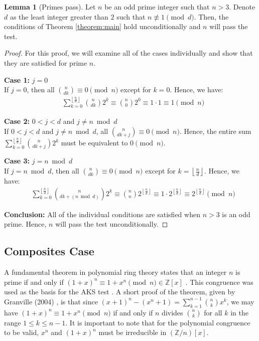 \documentclass{article}
\theoremstyle{plain}
\theoremstyle{definition}
\newtheorem{lemma}{Lemma}
\newcommand{\floor}[1]{\left\lfloor #1 \right\rfloor}
\newcommand{\Z}{\mathbb{Z}}
\newcommand{\Zn}{\Z/n}
\begin{document}
\begin{lemma}[Primes pass] \label{lemma:primes}
Let $n$ be an odd prime integer such that $n > 3$. Denote $d$ as the least integer greater than $2$ such that $n \not\equiv 1 \pmod{d}$. Then, the conditions of Theorem \ref{theorem:main} hold unconditionally and $n$ will pass the test.
\end{lemma}
\begin{proof}
For this proof, we will examine all of the cases individually and show that they are satisfied for prime $n$.

\textbf{Case 1:} $j=0$ \\
If $j = 0$, then all $\binom{n}{d k} \equiv 0 \pmod{n}$ except for $k=0$. Hence, we have:
\begin{align}
    & \sum_{k=0}^{\floor{\frac{n}{d}}} \binom{n}{d k} 2^{k} \equiv \binom{n}{0} 2^{0} \equiv 1 \cdot 1 \equiv 1 \pmod{n}
\end{align}

\textbf{Case 2:} $0 < j < d$ and $j \neq n \bmod{d}$ \\
If $0 < j < d$ and $j \neq n \bmod{d}$, all $\binom{n}{d k + j} \equiv 0 \pmod{n}$. Hence, the entire sum $\sum_{k=0}^{\floor{\frac{n}{d}}} \binom{n}{d k + j} 2^{k}$ must be equivalent to $0 \pmod{n}$.

\textbf{Case 3:} $j=n \bmod{d}$ \\
If $j = n \bmod{d}$, then all $\binom{n}{d k} \equiv 0 \pmod{n}$ except for $k=\floor{\frac{n}{d}}$. Hence, we have:
\begin{align}
    & \sum_{k=0}^{\floor{\frac{n}{d}}} \binom{n}{d k + (n \bmod{d})} 2^{k} \equiv \binom{n}{n} 2^{\floor{\frac{n}{d}}} \equiv 1 \cdot 2^{\floor{\frac{n}{d}}} \equiv 2^{\floor{\frac{n}{d}}} \pmod{n}
\end{align}

\textbf{Conclusion:}
All of the individual conditions are satisfied when $n > 3$ is an odd prime. Hence, $n$ will pass the test unconditionally.
\end{proof}

\subsection{Composites Case}

A fundamental theorem in polynomial ring theory states that an integer $n$ is prime if and only if $(1 + x)^n \equiv 1 + x^n \pmod{n} \in \Z[x]$ \cite{granville2004primes}. This congruence was used as the basis for the AKS test \cite{aks2002}. A short proof of the theorem, given by Granville (2004) \cite{granville2004primes}, is that since $(x + 1)^n - (x^n + 1) = \sum_{k=1}^{n-1} \binom{n}{k} x^k$, we may have $(1 + x)^n \equiv 1 + x^n \pmod{n}$ if and only if $n$ divides $\binom{n}{k}$ for all $k$ in the range $1 \leq k \leq n-1$. It is important to note that for the polynomial congruence to be valid, $x^n$ and $(1+x)^n$ must be irreducible in $(\Zn)[x]$.
\end{document}

